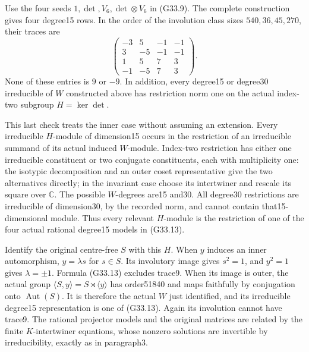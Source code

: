 Use the four seeds \(1,\det,V_6,\det\otimes V_6\) in
(G33.9). The complete construction gives four degree15 rows.
In the order of the involution class sizes
\(540,36,45,270\), their traces are
\[
 \begin{pmatrix}
 -3&5&-1&-1\\3&-5&-1&-1\\1&5&7&3\\-1&-5&7&3
 \end{pmatrix}.                                             \tag{G33.13}
\]
None of these entries is \(9\) or \(-9\). In addition, every
degree15 or degree30 irreducible of \(W\) constructed above
has restriction norm one on the actual index-two subgroup
\(H=\ker\det\).

This last check treats the inner case without assuming an
extension. Every irreducible \(H\)-module of dimension15 occurs
in the restriction of an irreducible summand of its actual
induced \(W\)-module. Index-two restriction has either one
irreducible constituent or two conjugate constituents, each
with multiplicity one: the isotypic decomposition and an outer
coset representative give the two alternatives directly; in
the invariant case choose its intertwiner and rescale its square
over \(\mathbb C\). The possible \(W\)-degrees are15 and30.
All degree30 restrictions are irreducible of dimension30, by
the recorded norm, and cannot contain that15-dimensional
module. Thus every relevant \(H\)-module is the restriction of
one of the four actual rational degree15 models in (G33.13).

Identify the original centre-free \(S\) with this \(H\).
When \(y\) induces an inner automorphism, \(y=\lambda s\)
for \(s\in S\). Its involutory image gives \(s^2=1\), and
\(y^2=1\) gives \(\lambda=\pm1\). Formula (G33.13) excludes
trace9. When its image is outer, the actual group
\(\langle S,y\rangle=S\rtimes\langle y\rangle\) has order51840
and maps faithfully by conjugation onto \(\operatorname{Aut}(S)\).
It is therefore the actual \(W\) just identified, and its
irreducible degree15 representation is one of (G33.13).
Again its involution cannot have trace9. The rational
projector models and the original matrices are related by the
finite \(K\)-intertwiner equations, whose nonzero solutions are
invertible by irreducibility, exactly as in paragraph3.


